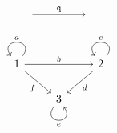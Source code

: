 \begin{computation}
\begin{minipage}{0.10\textwidth}
\[
\begin{tikzcd}
{} \arrow[rr, "\mathtt{q}"] &  & {}
\end{tikzcd}
\]
\end{minipage}
\begin{minipage}{0.02\textwidth}
\phantom{}
\end{minipage}
\begin{minipage}{0.43\textwidth}
\[
\begin{tikzcd}
1 \arrow["a"', loop, distance=2em, in=125, out=55] \arrow[rr, "b"] \arrow[rd, "f"'] &                                                     & 2 \arrow["c"', loop, distance=2em, in=125, out=55] \arrow[ld, "d"] \\
                                                                                    & 3 \arrow["e"', loop, distance=2em, in=305, out=235] &                                                                   
\end{tikzcd}
\]
\end{minipage}
\end{computation}







